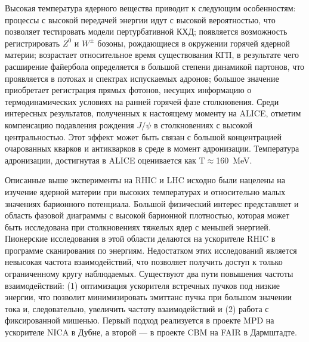 Высокая температура ядерного вещества приводит к следующим особенностям: процессы с высокой передачей энергии идут с высокой вероятностью, что позволяет тестировать модели пертурбативной КХД; появляется возможность регистрировать $Z^{0}$ и $W^{\pm}$ бозоны, рождающиеся в окружении горячей ядерной материи; возрастает относительное время существования КГП, в результате чего расширение файербола определяется в большой степени динамикой партонов, что проявляется в потоках и спектрах испускаемых адронов; большое значение приобретает регистрация прямых фотонов, несущих информацию о термодинамических условиях на ранней горячей фазе столкновения. Среди интересных результатов, полученных к настоящему моменту на ALICE, отметим компенсацию подавления рождения $J/\psi$ в столкновениях с высокой центральностью. Этот эффект может быть связан с большой концентрацией очарованных кварков и антикварков в среде в момент адронизации. Температура адронизации, достигнутая в ALICE оценивается как T$\approx$160~MeV.

\bigskip

%


Описанные выше эксперименты на RHIC и LHC исходно были нацелены на изучение ядерной материи при высоких температурах и относительно малых значениях барионного потенциала. Большой физический интерес представляет и область фазовой диаграммы с высокой барионной плотностью, которая может быть исследована при столкновениях тяжелых ядер с меньшей энергией. Пионерские исследования в этой области делаются на ускорителе RHIC в программе сканирования по энергиям. Недостатком этих исследований является невысокая частота взаимодействий, что позволяет получить доступ к только ограниченному кругу наблюдаемых. Существуют два пути повышения частоты взаимодействий: (1) оптимизация ускорителя встречных пучков под низкие энергии, что позволит минимизировать эмиттанс пучка при большом значении тока и, следовательно, увеличить частоту взаимодействий и (2) работа с фиксированной мишенью. Первый подход реализуется в проекте MPD на ускорителе NICA в Дубне, а второй --- в проекте CBM на FAIR в Дармштадте.

\bigskip


